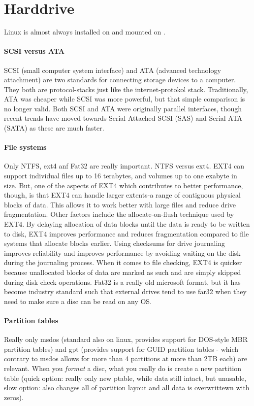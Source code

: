 \section{Harddrive}


Linux is almost always installed on  and mounted on \inlinecode{/}.

\paragraph{SCSI versus ATA} SCSI (small computer system interface) and ATA (advanced technology attachment) are two standards for connecting storage devices to a computer. They both are protocol-stacks just like the internet-protokol stack. Traditionally, ATA was cheaper while SCSI was more powerful, but that simple comparison is no longer valid. Both SCSI and ATA were originally parallel interfaces, though recent trends have moved towards Serial Attached SCSI (SAS) and Serial ATA (SATA) as these are much faster.


\paragraph{File systems} Only NTFS, ext4 anf Fat32 are really important. NTFS versus ext4. EXT4 can support individual files up to 16 terabytes, and volumes up to one exabyte in size. But, one of the aspects of EXT4 which contributes to better performance, though, is that EXT4 can handle larger extents-a range of contiguous physical blocks of data. This allows it to work better with large files and reduce drive fragmentation. Other factors include the allocate-on-flush technique used by EXT4. By delaying allocation of data blocks until the data is ready to be written to disk, EXT4 improves performance and reduces fragmentation compared to file systems that allocate blocks earlier.
Using checksums for drive journaling improves reliability and improves performance by avoiding waiting on the disk during the journaling process. When it comes to file checking, EXT4 is quicker because unallocated blocks of data are marked as such and are simply skipped during disk check operations.
Fat32 is a really old microsoft format, but it has become industry standard such that external drives tend to use far32 when they need to make sure a disc can be read on any OS. 


\paragraph{Partition tables} Really only msdos (standard also on linux, provides support for DOS-style MBR partition tables) and gpt (provides support for GUID partition tables - which contrary to msdos allows for more than 4 partitions at more than 2TB each) are relevant. When you \emph{format} a disc, what you really do is create a new partition table (quick option: really only new ptable, while data still intact, but unusable, slow option: also changes all of partition layout and all data is overwrittewn with zeros). 


